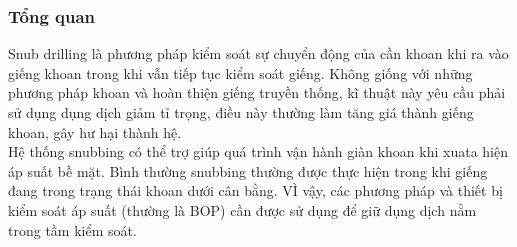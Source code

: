 \documentclass[12pt,a4paper]{article}
\begin{document}
\subsubsection{Tổng quan}
	Snub drilling\cite{rehm2013underbalanced} là phương pháp kiểm soát sự chuyển động của cần khoan khi ra vào giếng khoan trong khi vẫn tiếp tục kiểm soát giếng. Không giống với những phương pháp khoan và hoàn thiện giếng truyền thống, kĩ thuật này yêu cầu phải sử dụng dụng dịch giảm tỉ trọng, điều này thường làm tăng giá thành giếng khoan, gây hư hại thành hệ.\\
	Hệ thống snubbing có thể trợ giúp quá trình vận hành giàn khoan khi xuata hiện áp suất bề mặt. Bình thường snubbing thường được thực hiện trong khi giếng đang trong trạng thái khoan dưới cân bằng. VÌ vậy, các phương pháp và thiết bị kiểm soát áp suất (thường là BOP) cần được sử dụng để giữ dụng dịch nằm trong tầm kiểm soát.
\end{document}
